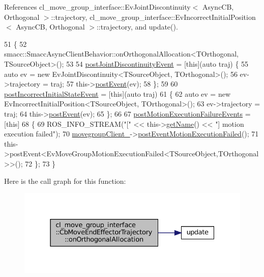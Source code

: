 References cl\+\_\+move\+\_\+group\+\_\+interface\+::\+Ev\+Joint\+Discontinuity$<$ Async\+C\+B, Orthogonal $>$\+::trajectory, cl\+\_\+move\+\_\+group\+\_\+interface\+::\+Ev\+Incorrect\+Initial\+Position$<$ Async\+C\+B, Orthogonal $>$\+::trajectory, and update().


\begin{DoxyCode}
51     \{
52       smacc::SmaccAsyncClientBehavior::onOrthogonalAllocation<TOrthogonal, TSourceObject>();
53 
54       \hyperlink{classcl__move__group__interface_1_1CbMoveEndEffectorTrajectory_a308331beab9b2ec0eae72fa56fa999c9}{postJointDiscontinuityEvent} = [\textcolor{keyword}{this}](\textcolor{keyword}{auto} traj) \{
55         \textcolor{keyword}{auto} ev = \textcolor{keyword}{new} EvJointDiscontinuity<TSourceObject, TOrthogonal>();
56         ev->trajectory = traj;
57         this->\hyperlink{classsmacc_1_1ISmaccClientBehavior_a5db577c585935114058770f2b7242f8a}{postEvent}(ev);
58       \};
59 
60       \hyperlink{classcl__move__group__interface_1_1CbMoveEndEffectorTrajectory_a6180230347c922fa0d85f514ce5029df}{postIncorrectInitialStateEvent} = [\textcolor{keyword}{this}](\textcolor{keyword}{auto} traj) 
61       \{
62         \textcolor{keyword}{auto} ev = \textcolor{keyword}{new} EvIncorrectInitialPosition<TSourceObject, TOrthogonal>();
63         ev->trajectory = traj;
64         this->\hyperlink{classsmacc_1_1ISmaccClientBehavior_a5db577c585935114058770f2b7242f8a}{postEvent}(ev);
65       \};
66 
67       \hyperlink{classcl__move__group__interface_1_1CbMoveEndEffectorTrajectory_a72c4a469b70617dc5ea75e225a013582}{postMotionExecutionFailureEvents} = [\textcolor{keyword}{this}]
68       \{
69           ROS\_INFO\_STREAM(\textcolor{stringliteral}{"["} << this->\hyperlink{classsmacc_1_1ISmaccClientBehavior_a18e4bec9460b010f2894c0f7e7064a34}{getName}() << \textcolor{stringliteral}{"] motion execution failed"});
70           \hyperlink{classcl__move__group__interface_1_1CbMoveEndEffectorTrajectory_aea650d3e7836125b32be97392b71a7f3}{movegroupClient\_}->\hyperlink{classcl__move__group__interface_1_1ClMoveGroup_a39dc3871d29b2af1ab739057f6ca6daa}{postEventMotionExecutionFailed}();
71           this->postEvent<EvMoveGroupMotionExecutionFailed<TSourceObject,TOrthogonal>>();
72       \};
73     \}    
\end{DoxyCode}
Here is the call graph for this function\+:
\nopagebreak
\begin{figure}[H]
\begin{center}
\leavevmode
\includegraphics[width=331pt]{classcl__move__group__interface_1_1CbMoveEndEffectorTrajectory_aae4797fba54cb3bf371cc67d26a82186_cgraph}
\end{center}
\end{figure}

